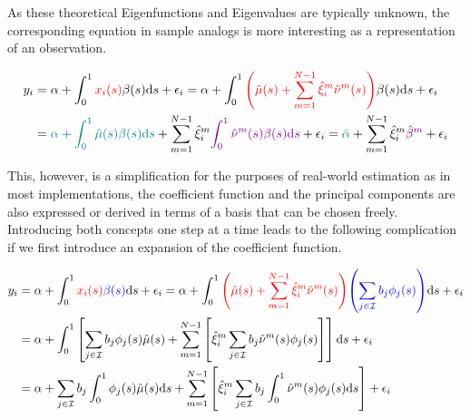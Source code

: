\documentclass[11pt,twoside,a4paper]{article}
\begin{document}
	As these theoretical Eigenfunctions and Eigenvalues are typically unknown, the corresponding equation in sample analogs is more interesting as a representation of an observation.
	
	\begin{equation}
		\begin{split}
			y_i &= \alpha + \int_{0}^{1} {\color{red}x_i(s)} \beta(s) \mathrm{d}s + \epsilon_i
			= \alpha + \int_{0}^{1} {\color{red}\left(\hat{\mu}(s) + \sum_{m = 1}^{N-1} \hat{\xi}^m_i \hat{\nu}^m(s)\right)} \beta(s) \mathrm{d}s + \epsilon_i\\
			&= {\color{teal}\alpha + \int_{0}^{1} \hat{\mu}(s) \beta(s) \mathrm{d}s} + \sum_{m = 1}^{N-1} \hat{\xi}^m_i {\color{violet}\int_{0}^{1} \hat{\nu}^m(s) \beta(s) \mathrm{d}s} + \epsilon_i
			= {\color{teal}\bar{\alpha}} + \sum_{m = 1}^{N-1} \hat{\xi}^m_i {\color{violet}\hat{\beta}^m} + \epsilon_i
		\end{split}
	\end{equation}
	
	This, however, is a simplification for the purposes of real-world estimation as in most implementations, the coefficient function and the principal components are also expressed or derived in terms of a basis that can be chosen freely. Introducing both concepts one step at a time leads to the following complication if we first introduce an expansion of the coefficient function.

	\begin{equation}
		\begin{split}
			y_i &= \alpha + \int_{0}^{1} {\color{red}x_i(s)} {\color{blue}\beta(s)} \mathrm{d}s + \epsilon_i
			= \alpha + \int_{0}^{1} {\color{red}\left(\hat{\mu}(s) + \sum_{m = 1}^{N-1} \hat{\xi}^{m}_i \hat{\nu}^{m}(s)\right)} {\color{blue}\left(\sum_{j \in \mathcal{I}} b_j \phi_j(s)\right)} \mathrm{d}s + \epsilon_i\\
			&= \alpha + \int_{0}^{1} \left[ \sum_{j \in \mathcal{I}} b_j \phi_j(s) \hat{\mu}(s) + \sum_{m = 1}^{N-1} \left[ \hat{\xi}^m_i \sum_{j \in \mathcal{I}} b_j \hat{\nu}^m(s) \phi_j(s) \right] \right] \mathrm{d}s + \epsilon_i \\
			&= \alpha + \sum_{j \in \mathcal{I}} b_j \int_{0}^{1} \phi_j(s) \hat{\mu}(s) \mathrm{d}s + \sum_{m = 1}^{N-1} \left[ \hat{\xi}^m_i \sum_{j \in \mathcal{I}} b_j \int_{0}^{1}\hat{\nu}^m(s) \phi_j(s) \mathrm{d}s \right] + \epsilon_i
		\end{split}
	\end{equation}
\end{document}
